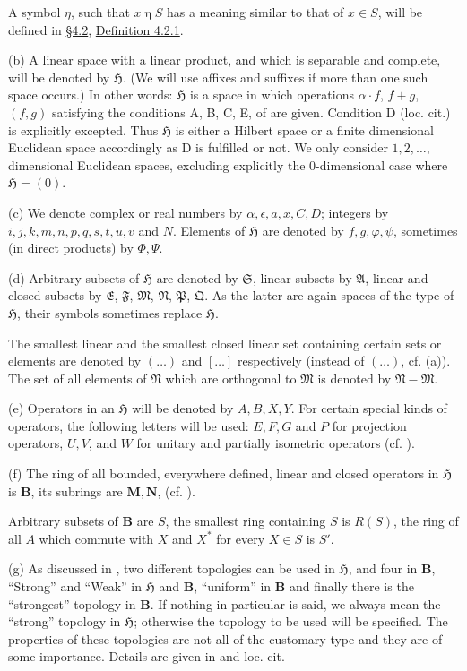 \documentclass[12pt,b5paper,twoside]{article}
\newcommand{\Hspace}{\mathfrak H}
\newcommand{\M}{\mathbf M}
\newcommand{\N}{\mathbf N}
\newcommand{\B}{\mathbf B}
\newcommand{\secref}[1]{\hyperref[sec:#1]{\S#1}}
\newcommand{\defref}[1]{\hyperref[def:#1]{Definition #1}}
\begin{document}
A symbol $\eta$, such that $x\mathbin{\eta}S$ has a meaning similar to that
of $x\in S$, will be defined in \secref{4.2}, \defref{4.2.1}.

\noindent (b) A linear space with a linear product, and which is separable and
complete, will be denoted by $\Hspace$. (We will use affixes and suffixes if
more than one such space occurs.) In other words: $\Hspace$ is a space in
which operations $\alpha\cdot f$, $f+g$, $(f,g)$ satisfying the conditions
A, B, C, E, of \cite[pp.~64--66]{ref16} are given. Condition D (loc. cit.) is
explicitly excepted. Thus $\Hspace$ is either a Hilbert space or a finite
dimensional Euclidean space accordingly as D is fulfilled or not. We only
consider $1,2,\ldots$, dimensional Euclidean spaces, excluding explicitly the
0-dimensional case where $\Hspace=(0)$.

\noindent (c) We denote complex or real numbers by
$\alpha,\epsilon,a,x,C,D$; integers by $i,j,k,m,n,p,q,\allowbreak s,t,u,v$ and $N$.
Elements of $\Hspace$ are denoted by $f,g,\varphi,\psi$, sometimes (in direct
products) by $\Phi,\Psi$.

\noindent (d) Arbitrary subsets of $\Hspace$ are denoted by $\mathfrak S$,
linear subsets by $\mathfrak A$, linear and closed subsets by
$\mathfrak E$, $\mathfrak F$, $\mathfrak M$, $\mathfrak N$,
$\mathfrak P$, $\mathfrak Q$.
As the latter are again spaces of the type of $\Hspace$, their symbols
sometimes replace $\Hspace$.

The smallest linear and the smallest closed linear set containing certain sets
or elements are denoted by $(\ldots)$ and $[\ldots]$ respectively (instead of
$(\ldots)$, cf. (a)). The set of all elements of $\mathfrak N$ which are
orthogonal to $\mathfrak M$ is denoted by $\mathfrak N-\mathfrak M$.

\noindent (e) Operators in an $\Hspace$ will be denoted by $A,B,X,Y$. For
certain special kinds of operators, the following letters will be used:
$E,F,G$ and $P$ for projection operators, $U,V$, and $W$ for unitary and
partially isometric operators (cf. \cite[p.~70]{ref16}).

\noindent (f) The ring of all bounded, everywhere defined, linear and closed
operators in $\Hspace$ is $\B$, its subrings are $\M,\N$, (cf.
\cite[p.~388]{ref18}).

Arbitrary subsets of $\B$ are $S$, the smallest ring containing $S$ is
$R(S)$, the ring of all $A$ which commute with $X$ and $X^*$ for every
$X\in S$ is $S'$.

\noindent (g) As discussed in \cite[pp.~378--388]{ref18}, two different
topologies can be used in $\Hspace$, and four in $\B$, ``Strong'' and
``Weak'' in $\Hspace$ and $\B$, ``uniform'' in $\B$ and finally there is the
``strongest'' topology in $\B$. If nothing in particular is said, we always
mean the ``strong'' topology in $\Hspace$; otherwise the topology to be used
will be specified. The properties of these topologies are not all of the
customary type and they are of some importance. Details are given in
\cite{ref18} and \cite{ref22} loc. cit.
\end{document}
